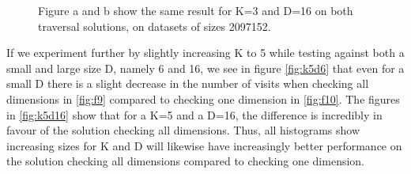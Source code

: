\begin{figure}[H]
  \centering
  \caption{Figure a and b show the same result for K=3 and D=16 on both traversal solutions, on datasets of sizes 2097152.}
  \label{fig:k3d16}
\end{figure}


If we experiment further by slightly increasing K to 5 while testing against both a small and large size D, namely 6 and 16, we see in figure \ref{fig:k5d6} that even for a small D there is a slight decrease in the number of visits when checking all dimensions in \ref{fig:f9} compared to checking one dimension in \ref{fig:f10}. The figures in \ref{fig:k5d16} show that for a K=5 and a D=16, the difference is incredibly in favour of the solution checking all dimensions. Thus, all histograms show increasing sizes for K and D will likewise have increasingly better performance on the solution checking all dimensions compared to checking one dimension. 

